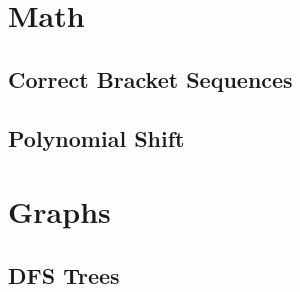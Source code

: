 \documentclass[12pt]{article}
\begin{document}
\section{Math}

\subsection{Correct Bracket Sequences}


\subsection{Polynomial Shift}



\section{Graphs}

\subsection{DFS Trees}

\end{document}
